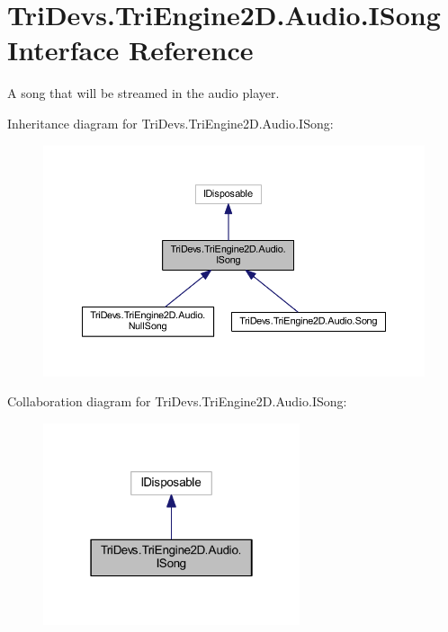 \hypertarget{interface_tri_devs_1_1_tri_engine2_d_1_1_audio_1_1_i_song}{\section{Tri\-Devs.\-Tri\-Engine2\-D.\-Audio.\-I\-Song Interface Reference}
\label{interface_tri_devs_1_1_tri_engine2_d_1_1_audio_1_1_i_song}
}


A song that will be streamed in the audio player.  




Inheritance diagram for Tri\-Devs.\-Tri\-Engine2\-D.\-Audio.\-I\-Song\-:\nopagebreak
\begin{figure}[H]
\begin{center}
\leavevmode
\includegraphics[width=350pt]{interface_tri_devs_1_1_tri_engine2_d_1_1_audio_1_1_i_song__inherit__graph}
\end{center}
\end{figure}


Collaboration diagram for Tri\-Devs.\-Tri\-Engine2\-D.\-Audio.\-I\-Song\-:\nopagebreak
\begin{figure}[H]
\begin{center}
\leavevmode
\includegraphics[width=214pt]{interface_tri_devs_1_1_tri_engine2_d_1_1_audio_1_1_i_song__coll__graph}
\end{center}
\end{figure}

